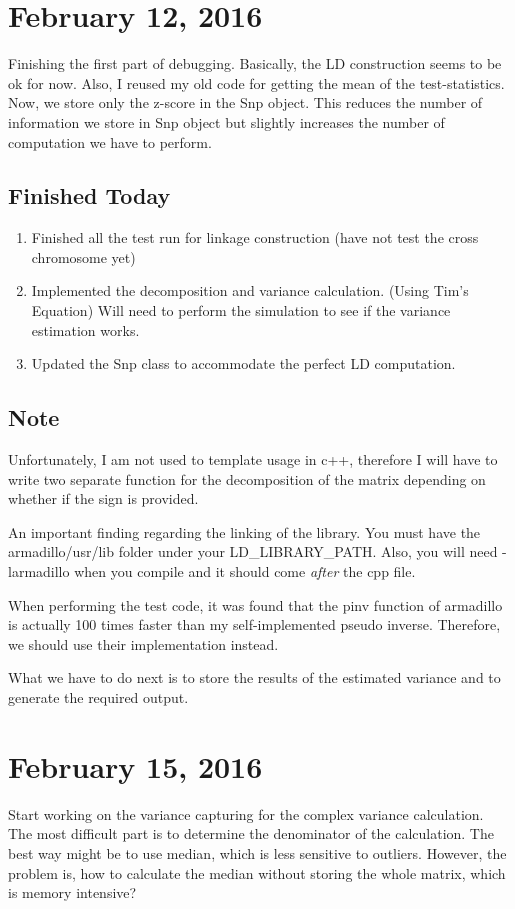 \documentclass[12pt]{article}
\begin{document}
	\section{February 12, 2016}
	Finishing the first part of debugging. 
	Basically, the LD construction seems to be ok for now.
	Also, I reused my old code for getting the mean of the test-statistics.
	Now, we store only the z-score in the Snp object.
	This reduces the number of information we store in Snp object but slightly increases the number of computation we have to perform.
	\subsection{Finished Today}
	\begin{enumerate}
		\item Finished all the test run for linkage construction (have not test the cross chromosome yet)
		\item Implemented the decomposition and variance calculation. (Using Tim's Equation)
		Will need to perform the simulation to see if the variance estimation works. 
		\item Updated the Snp class to accommodate the perfect LD computation.
	\end{enumerate}
	
	\subsection{Note}
	Unfortunately, I am not used to template usage in c++, therefore I will have to write two separate function for the decomposition of the matrix depending on whether if the sign is provided.
	
	An important finding regarding the linking of the library.
	You must have the armadillo/usr/lib folder under your LD\_LIBRARY\_PATH.
	Also, you will need -larmadillo when you compile and it should come \emph{after} the cpp file.
	
	When performing the test code, it was found that the pinv function of armadillo is actually 100 times faster than my self-implemented pseudo inverse. 
	Therefore, we should use their implementation instead.
	
	What we have to do next is to store the results of the estimated variance and to generate the required output.
	\section {February 15, 2016}
	Start working on the variance capturing for the complex variance calculation.
	The most difficult part is to determine the denominator of the calculation.
	The best way might be to use median, which is less sensitive to outliers.
	However, the problem is, how to calculate the median without storing the whole matrix, which is memory intensive?
	
\end{document}

